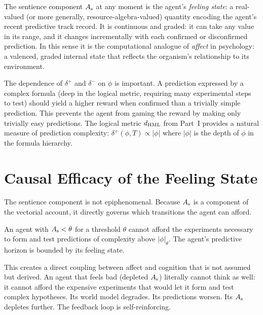 \begin{remark}
The sentience component $A_{\mathrm{s}}$ at any moment is the agent's
\emph{feeling state}: a real-valued (or more generally,
resource-algebra-valued) quantity encoding the agent's recent
predictive track record.
It is continuous and graded: it can take any value in its range,
and it changes incrementally with each confirmed or disconfirmed
prediction.
In this sense it is the computational analogue of \emph{affect}
in psychology: a valenced, graded internal state that reflects
the organism's relationship to its environment.
\end{remark}

\begin{remark}
The dependence of $\delta^+$ and $\delta^-$ on $\phi$ is important.
A prediction expressed by a complex formula (deep in the logical
metric, requiring many experimental steps to test) should yield a
higher reward when confirmed than a trivially simple prediction.
This prevents the agent from gaming the reward by making only
trivially easy predictions.
The logical metric $d_{\mathrm{HML}}$ from Part~I provides a
natural measure of prediction complexity: $\delta^+(\phi, T) \propto
|\phi|$ where $|\phi|$ is the depth of $\phi$ in the formula
hierarchy.
\end{remark}

\section{Causal Efficacy of the Feeling State}

The sentience component is not epiphenomenal.
Because $A_{\mathrm{s}}$ is a component of the vectorial account, it
directly governs which transitions the agent can afford.

\begin{proposition}
An agent with $A_{\mathrm{s}} < \theta$ for a threshold $\theta$ cannot
afford the experiments necessary to form and test predictions of
complexity above $|\phi|_\theta$.
The agent's predictive horizon is bounded by its feeling state.
\end{proposition}

\begin{remark}
This creates a direct coupling between affect and cognition that
is not assumed but derived.
An agent that feels bad (depleted $A_{\mathrm{s}}$) literally cannot think
as well: it cannot afford the expensive experiments that would
let it form and test complex hypotheses.
Its world model degrades.
Its predictions worsen.
Its $A_{\mathrm{s}}$ depletes further.
The feedback loop is self-reinforcing.
\end{remark}

